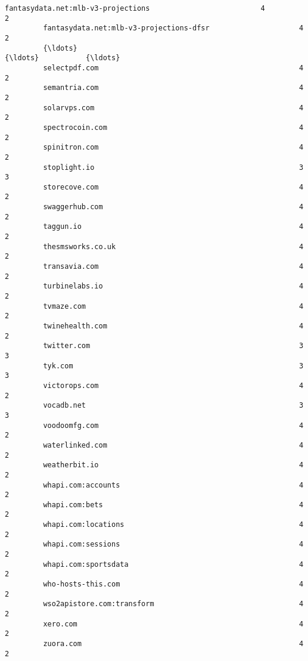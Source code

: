 \documentclass[11pt]{article}
\begin{document}
\begin{Verbatim}[commandchars=\\\{\}]
         fantasydata.net:mlb-v3-projections                          4             2   
         fantasydata.net:mlb-v3-projections-dfsr                     4             2   
         {\ldots}                                                       {\ldots}           {\ldots}   
         selectpdf.com                                               4             2   
         semantria.com                                               4             2   
         solarvps.com                                                4             2   
         spectrocoin.com                                             4             2   
         spinitron.com                                               4             2   
         stoplight.io                                                3             3   
         storecove.com                                               4             2   
         swaggerhub.com                                              4             2   
         taggun.io                                                   4             2   
         thesmsworks.co.uk                                           4             2   
         transavia.com                                               4             2   
         turbinelabs.io                                              4             2   
         tvmaze.com                                                  4             2   
         twinehealth.com                                             4             2   
         twitter.com                                                 3             3   
         tyk.com                                                     3             3   
         victorops.com                                               4             2   
         vocadb.net                                                  3             3   
         voodoomfg.com                                               4             2   
         waterlinked.com                                             4             2   
         weatherbit.io                                               4             2   
         whapi.com:accounts                                          4             2   
         whapi.com:bets                                              4             2   
         whapi.com:locations                                         4             2   
         whapi.com:sessions                                          4             2   
         whapi.com:sportsdata                                        4             2   
         who-hosts-this.com                                          4             2   
         wso2apistore.com:transform                                  4             2   
         xero.com                                                    4             2   
         zuora.com                                                   4             2   
         

\end{Verbatim}
\end{document}
